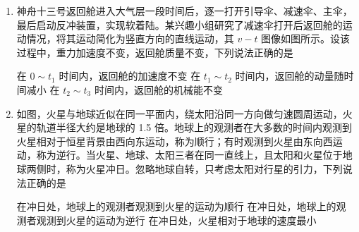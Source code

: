 \documentclass[\gkver]{gaokaozhenti}
\begin{document}
\begin{enumerate}
{故选 B。
}

\item
神舟十三号返回舱进入大气层一段时间后，逐一打开引导伞、减速伞、主伞，最后启动反冲装置，实现软着陆。某兴趣小组研究了减速伞打开后返回舱的运动情况，将其运动简化为竖直方向的直线运动，其 $v-t$ 图像如图所示。设该过程中，重力加速度不变，返回舱质量不变，下列说法正确的是


{在 $0\sim t_{1}$ 时间内，返回舱的加速度不变}
{在 $t_{1}\sim t_{2}$ 时间内，返回舱的动量随时间减小}
{在 $t_{2}\sim t_{3}$ 时间内，返回舱的机械能不变}


\item
如图，火星与地球近似在同一平面内，绕太阳沿同一方向做匀速圆周运动，火星的轨道半径大约是地球的 1.5 倍。地球上的观测者在大多数的时间内观测到火星相对于恒星背景由西向东运动，称为顺行；有时观测到火星由东向西运动，称为逆行。当火星、地球、太阳三者在同一直线上，且太阳和火星位于地球两侧时，称为火星冲日。忽略地球自转，只考虑太阳对行星的引力，下列说法正确的是


{在冲日处，地球上的观测者观测到火星的运动为顺行}
{在冲日处，地球上的观测者观测到火星的运动为逆行}
{在冲日处，火星相对于地球的速度最小}


\end{enumerate}
\end{document}
